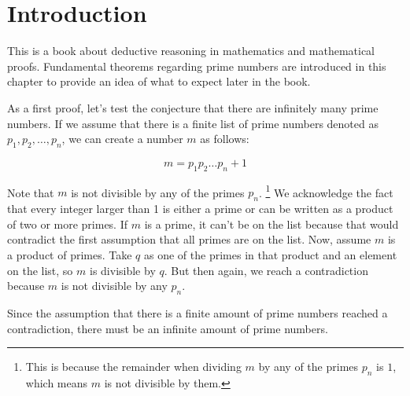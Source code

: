 \chapter{Introduction}

This is a book about deductive reasoning in mathematics and mathematical proofs. 
Fundamental theorems regarding prime numbers are introduced in this chapter to provide an idea of what to expect later in the book.

As a first proof, let's test the conjecture that there are infinitely many prime numbers.
If we assume that there is a finite list of prime numbers denoted as $p_1, p_2, \ldots, p_n$, we can create a number $m$ as follows:

\[
m = p_1p_2 \ldots p_n + 1
\]

Note that $m$ is not divisible by any of the primes $p_n$.
\footnote{This is because the remainder when dividing $m$ by any of the primes $p_n$ is $1$, 
which means $m$ is not divisible by them.}
We acknowledge the fact that every integer larger than 1 is either a prime or can be written as a product of two or more primes. 
If $m$ is a prime, it can't be on the list because that would contradict the first assumption that all primes are on the list. 
Now, assume $m$ is a product of primes. 
Take $q$ as one of the primes in that product and an element on the list, so $m$ is divisible by $q$. 
But then again, we reach a contradiction because $m$ is not divisible by any $p_n$.

Since the assumption that there is a finite amount of prime numbers reached a contradiction, there must be an infinite amount of prime numbers.



